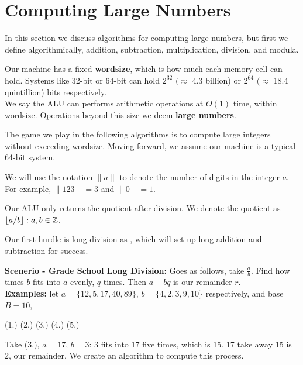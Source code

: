 \section{Computing Large Numbers}
\noindent
In this section we discuss algorithms for computing large numbers, but first we define 
algorithmically, addition, subtraction, multiplication, division, and modula.

\begin{Def}[Wordsize]

    Our machine has a fixed \textbf{wordsize}, which is how much each memory cell can hold. Systems like 32-bit or 64-bit can hold $2^{32}$ $(\approx$ 4.3 billion) or $2^{64}$ $(\approx$ 18.4 quintillion) bits respectively.\\

    \noindent
    We say the ALU can performs arithmetic operations at $O(1)$ time, within wordsize. Operations beyond this size we deem \textbf{large numbers}.
\end{Def}
\noindent
The game we play in the following algorithms is to compute large integers without exceeding wordsize. Moving forward, we assume our machine is a typical 64-bit system.
\begin{Func}

    We will use the notation $\|a\|$ to denote the number of digits in the integer $a$. For example, $\|123\| = 3$ and $\|0\| = 1$.
\end{Func}

\newpage
\begin{Def}

    Our ALU  \underline{only returns the quotient after division.} We denote the quotient as $\floor*{a/b}:a,b\in\Z$.
\end{Def}

\noindent
Our first hurdle is long division as , which will set up long addition and subtraction for success.

\noindent
\textbf{Scenerio - Grade School Long Division:} Goes as follows, take $\frac{a}{b}$. Find how times $b$ fits into $a$ evenly, $q$ times. Then $a-bq$ is our remainder $r$.\\
\textbf{Examples:} let $a=\{12,5,17,40,89\}$, $b=\{4,2,3,9,10\}$ respectively, and base $B=10$,
\begin{center}
    (1.) (2.) (3.) (4.) (5.) 
\end{center}
\noindent
Take (3.), $a=17$, $b=3$: 3 fits into 17 five times, which is 15. 17 take away 15 is 2, our remainder. We 
create an algorithm to compute this process.\\

